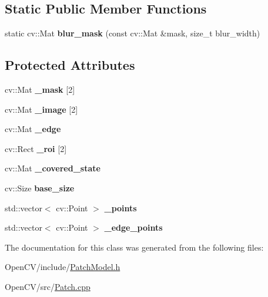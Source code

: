 \subsection*{Static Public Member Functions}
\begin{DoxyCompactItemize}
\item 
\hypertarget{classskl_1_1_patch_ab33610ba0447e8f343c2d7e7dbbebe7a}{}\label{classskl_1_1_patch_ab33610ba0447e8f343c2d7e7dbbebe7a} 
static cv\+::\+Mat {\bfseries blur\+\_\+mask} (const cv\+::\+Mat \&mask, size\+\_\+t blur\+\_\+width)
\end{DoxyCompactItemize}
\subsection*{Protected Attributes}
\begin{DoxyCompactItemize}
\item 
\hypertarget{classskl_1_1_patch_aa056ad5596cf6874ff2b1324b1feeb7c}{}\label{classskl_1_1_patch_aa056ad5596cf6874ff2b1324b1feeb7c} 
cv\+::\+Mat {\bfseries \+\_\+mask} \mbox{[}2\mbox{]}
\item 
\hypertarget{classskl_1_1_patch_abfb3a9a0f09a8e781b21c53114250790}{}\label{classskl_1_1_patch_abfb3a9a0f09a8e781b21c53114250790} 
cv\+::\+Mat {\bfseries \+\_\+image} \mbox{[}2\mbox{]}
\item 
\hypertarget{classskl_1_1_patch_a6f49c51be64d4c920cd105a6518874c4}{}\label{classskl_1_1_patch_a6f49c51be64d4c920cd105a6518874c4} 
cv\+::\+Mat {\bfseries \+\_\+edge}
\item 
\hypertarget{classskl_1_1_patch_adadf5ea37cb2161b715c326dec6f7b01}{}\label{classskl_1_1_patch_adadf5ea37cb2161b715c326dec6f7b01} 
cv\+::\+Rect {\bfseries \+\_\+roi} \mbox{[}2\mbox{]}
\item 
\hypertarget{classskl_1_1_patch_a0675a67ef7fc045f3b1fc10c9850a20c}{}\label{classskl_1_1_patch_a0675a67ef7fc045f3b1fc10c9850a20c} 
cv\+::\+Mat {\bfseries \+\_\+covered\+\_\+state}
\item 
\hypertarget{classskl_1_1_patch_abf2c18d9da914d52dfb57249a56b292a}{}\label{classskl_1_1_patch_abf2c18d9da914d52dfb57249a56b292a} 
cv\+::\+Size {\bfseries base\+\_\+size}
\item 
\hypertarget{classskl_1_1_patch_a556e8355c58e1923f752e78122528fe5}{}\label{classskl_1_1_patch_a556e8355c58e1923f752e78122528fe5} 
std\+::vector$<$ cv\+::\+Point $>$ {\bfseries \+\_\+points}
\item 
\hypertarget{classskl_1_1_patch_a28121ed6024a12767302450a4aa2d7b2}{}\label{classskl_1_1_patch_a28121ed6024a12767302450a4aa2d7b2} 
std\+::vector$<$ cv\+::\+Point $>$ {\bfseries \+\_\+edge\+\_\+points}
\end{DoxyCompactItemize}


The documentation for this class was generated from the following files\+:\begin{DoxyCompactItemize}
\item 
Open\+C\+V/include/\hyperlink{_patch_model_8h}{Patch\+Model.\+h}\item 
Open\+C\+V/src/\hyperlink{_patch_8cpp}{Patch.\+cpp}\end{DoxyCompactItemize}
